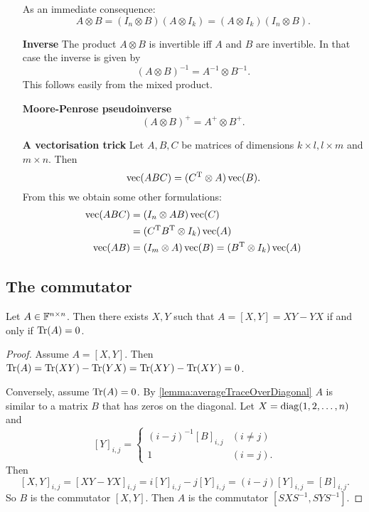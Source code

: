 \begin{itemize}
As an immediate consequence:
\[ A\otimes B = (I_n\otimes B)(A\otimes I_k) = (A\otimes I_k)(I_n \otimes B). \]

\item[\textbf{Inverse}]
The product $A\otimes B$ is invertible iff $A$ and $B$ are invertible. In that case the inverse is given by
\[ (A\otimes B)^{-1} = A^{-1}\otimes B^{-1}. \]
This follows easily from the mixed product.
\item[\textbf{Moore-Penrose pseudoinverse}]
\[ (A\otimes B)^+ = A^+\otimes B^+. \]

\item[\textbf{A vectorisation trick}]
Let $A,B,C$ be matrices of dimensions $k\times l, l\times m$ and $m\times n$. Then
\[ \operatorname{vec}(ABC) = (C^{\mathrm{T}}\otimes A)\operatorname{vec}(B). \]
From this we obtain some other formulations:
\begin{align}
\operatorname{vec}(ABC) &= (I_n\otimes AB)\operatorname{vec}(C) \\
&= (C^{\mathrm{T}} B^{\mathrm{T}} \otimes I_k)\operatorname{vec}(A) \\
\operatorname{vec}(AB) &= (I_m\otimes A)\operatorname{vec}(B) = (B^{\mathrm{T}} \otimes I_k)\operatorname{vec}(A)
\end{align}
\end{itemize}

\subsection{The commutator}
\begin{theorem}
Let $A\in\mathbb{F}^{n\times n}$. Then there exists $X,Y$ such that $A=[X,Y] = XY-YX$ \textup{if and only if} $\operatorname{Tr}(A) = 0$.
\end{theorem}
\begin{proof}
Assume $A = [X,Y]$. Then $\operatorname{Tr}(A) = \operatorname{Tr}(XY) -\operatorname{Tr}(YX) = \operatorname{Tr}(XY) - \operatorname{Tr}(XY) = 0$.

Conversely, assume $\operatorname{Tr}(A) = 0$. By \ref{lemma:averageTraceOverDiagonal} $A$ is similar to a matrix $B$ that has zeros on the diagonal. Let $X = \operatorname{diag}(1,2,\ldots, n)$ and
\[ [Y]_{i,j} = \begin{cases}
(i-j)^{-1}[B]_{i,j} & (i\neq j) \\
1 & (i=j).
\end{cases} \]
Then
\[ [X,Y]_{i,j} = [XY-YX]_{i,j} = i[Y]_{i,j}-j[Y]_{i,j} = (i-j)[Y]_{i,j} = [B]_{i,j}. \]
So $B$ is the commutator $[X,Y]$. Then $A$ is the commutator $[SXS^{-1}, SYS^{-1}]$.
\end{proof}

